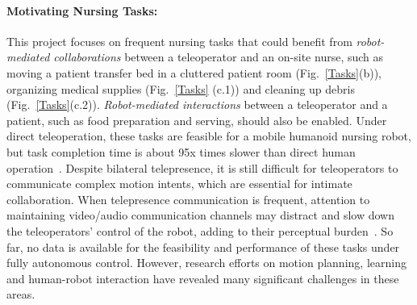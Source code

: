 \documentclass[letterpaper, 11 pt, onecolumn]{article}
\newcommand{\fig}[1]{Fig.~\ref{#1}}
\begin{document}
\paragraph*{Motivating Nursing Tasks:} This project focuses on frequent nursing tasks that could benefit from \textit{robot-mediated collaborations} between a teleoperator and an on-site nurse, such as moving a patient transfer bed in a cluttered patient room (\fig{Tasks}(b)), organizing medical supplies (\fig{Tasks} (c.1)) and cleaning up debris (\fig{Tasks}(c.2)).
\textit{Robot-mediated interactions} between a teleoperator and a patient, such as food preparation and serving, should also be enabled.
Under direct teleoperation, these tasks are feasible for a mobile humanoid nursing robot, but task completion time is about 95x times slower than direct human operation~\cite{Hauser_Li_TRINA:17}.
Despite bilateral telepresence, it is still difficult for teleoperators to communicate complex motion intents, which are essential for intimate collaboration.
When telepresence communication is frequent, attention to maintaining video/audio communication channels may distract and slow down the teleoperators' control of the robot, adding to their perceptual burden~\cite{Hauser_Li_BiTelepresence:17}.
So far, no data is available for the feasibility and performance of these tasks under fully autonomous control.
However, research efforts on motion planning, learning and human-robot interaction have revealed many significant challenges in these areas.
\end{document}

